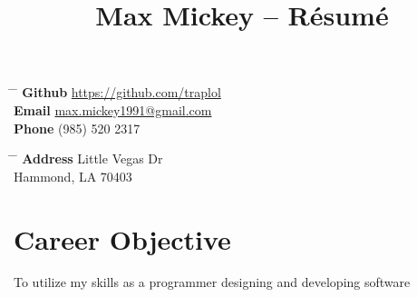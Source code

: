 \documentclass[10pt]{article} %
\begin{document}

\title{Max Mickey -- Résumé} 


\parbox{0.5\textwidth}{ %
\begin{tabbing} 
\hspace{2cm} \= \hspace{3cm} \= \kill 
\textbf {Github} \> \href{https://github.com/traplol}{https://github.com/traplol} \\ 
\textbf {Email} \> \href{mailto:max.mickey1991@gmail.com}{max.mickey1991@gmail.com} \\ 
\textbf {Phone} \> (985) 520 2317 \\ 
\end{tabbing}}
\hfill 
\parbox{0.5\textwidth}{ %
\begin{tabbing} 
\hspace{2cm} \= \hspace{3cm} \= \kill 
\textbf {Address}  Little Vegas Dr\\ %
\> Hammond, LA 70403 \\ %
\end{tabbing}}

\vspace{-10mm}
%
%
\section{Career Objective}
\vspace{-3mm}

To utilize my skills as a programmer designing and developing software
\end{document}
